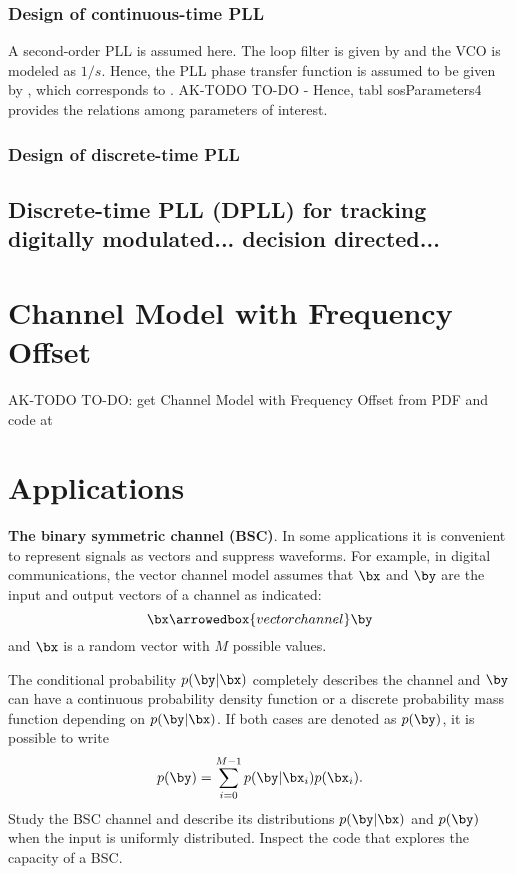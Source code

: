 \subsubsection{Design of continuous-time PLL}

A second-order PLL is assumed here.
The loop filter is given by 
and the VCO is modeled as $1/s$. Hence, the PLL
phase transfer function is assumed to be given by
, which corresponds to .
AK-TODO TO-DO - Hence, tabl {sosParameters4} provides the relations among parameters of interest.

\subsubsection{Design of discrete-time PLL}

\subsection{Discrete-time PLL (DPLL) for tracking digitally modulated... decision directed...}

\section{Channel Model with Frequency Offset}

AK-TODO TO-DO: get Channel Model with Frequency Offset from PDF
and code at

\section{Applications}

\bApplication \textbf{The binary symmetric channel (BSC)}.
In some applications it is convenient to represent signals as vectors and suppress waveforms. For example, in digital communications, the vector channel model assumes that $\bx$ and $\by$ are the input and output vectors of a channel as indicated:
\[
\bx \arrowedbox{vector channel} \by
\]
and $\bx$ is a random vector with $M$ possible values.

The conditional probability $p(\by|\bx)$ completely describes the channel and $\by$ can have a continuous probability density function or a discrete probability mass function depending on $p(\by|\bx)$. If both cases are denoted as $p(\by)$, it is possible to write
\[
p(\by) = \sum_{i=0}^{M-1} p(\by|\bx_i) p(\bx_i).
\]
Study the BSC channel and describe its distributions $p(\by|\bx)$ and $p(\by)$ when the input is uniformly distributed. Inspect the code
 that explores the capacity of a BSC.
\eApplication


